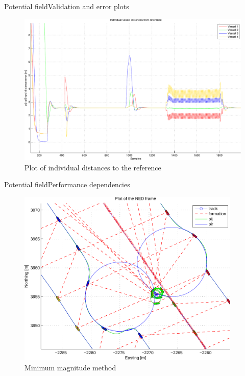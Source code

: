 \documentclass[10pt,handout]{beamer}
\begin{document}
\begin{frame}{Potential field}{Validation and error plots}
  \begin{figure}
    \includegraphics[width=\textwidth]{img/pdfdistfromref}
    \caption{Plot of individual distances to the reference}
  \end{figure}
\end{frame}

\begin{frame}{Potential field}{Performance dependencies}
  \begin{figure}
    \includegraphics[width=0.95\textwidth]{img/wp_gen_ass_fail}
    \caption{Minimum magnitude method}
  \end{figure}
\end{frame}
\end{document}
